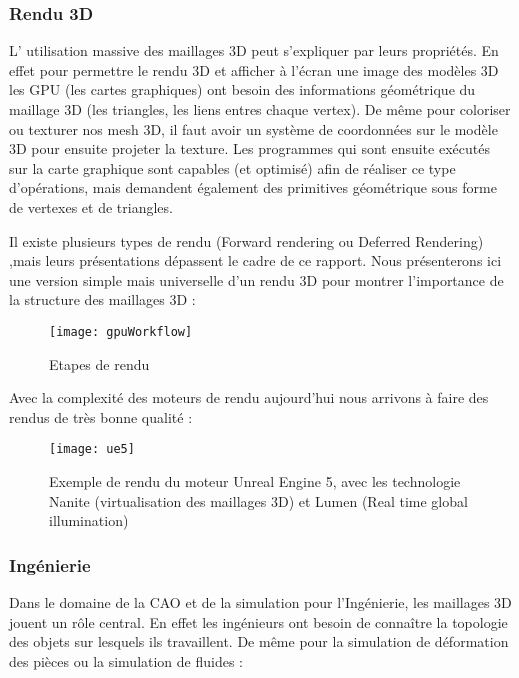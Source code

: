 \subsubsection{Rendu 3D}
L' utilisation massive des maillages 3D peut s'expliquer par leurs propriétés. En effet pour permettre le rendu 3D et afficher à l'écran une image des modèles 3D les GPU (les cartes graphiques) ont besoin des informations géométrique du maillage 3D (les triangles, les liens entres chaque vertex). De même pour coloriser ou texturer nos mesh 3D, il faut avoir un système de coordonnées sur le modèle 3D pour ensuite projeter la texture. Les programmes qui sont ensuite exécutés sur la carte graphique sont capables (et optimisé) afin de réaliser ce type d'opérations, mais demandent également des primitives géométrique sous forme de vertexes et de triangles.

Il existe plusieurs types de rendu (Forward rendering ou Deferred Rendering) ,mais leurs présentations dépassent le cadre de ce rapport. Nous présenterons ici une version simple mais universelle d'un rendu 3D pour montrer l'importance de la structure des maillages 3D :

\begin{figure}[h]
    \centering
    \texttt{[image: gpuWorkflow]}
    \caption{Etapes de rendu}
    \label{fig:render}
\end{figure}
\FloatBarrier

\newpage

Avec la complexité des moteurs de rendu aujourd'hui nous arrivons à faire des rendus de très bonne qualité :

\begin{figure}[h]
    \centering
    \texttt{[image: ue5]}
    \caption{Exemple de rendu du moteur Unreal Engine 5, avec les technologie Nanite (virtualisation des maillages 3D) et Lumen (Real time global illumination)}
    \label{fig:render}
\end{figure}
\FloatBarrier


\subsubsection{Ingénierie}
Dans le domaine de la CAO et de la simulation pour l'Ingénierie, les maillages 3D jouent un rôle central. En effet les ingénieurs ont besoin de connaître la topologie des objets sur lesquels ils travaillent. De même pour la simulation de déformation des pièces ou la simulation de fluides :

